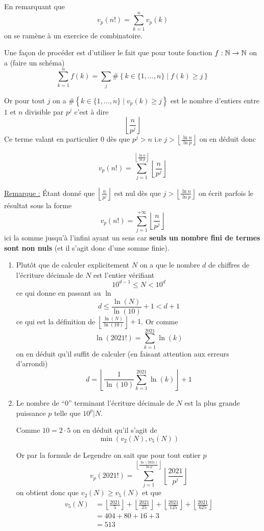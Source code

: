 \begin{sol}
En remarquant que
$$v_p(n!) = \sum_{k=1}^n v_p(k)$$
on se ramène à un exercice de combinatoire.

Une façon de procéder est d'utiliser le fait que pour toute fonction $f : \mathbb N \to \mathbb N$ on a (faire un schéma)
$$\sum_{k=1}^n f(k) = \sum_j \# \left\lbrace k \in \{1,\ldots,n\} \mid f(k) \ge j\right\rbrace$$

Or pour tout $j$  on a $\# \left\lbrace k \in \{1,\ldots,n\} \mid v_p(k) \ge j\right\rbrace$ est le nombre d'entiers entre $1$ et $n$ divisible par $p^j$ c'est à dire
$$\left\lfloor \frac n{p^j} \right\rfloor$$
Ce terme valant en particulier  $0$ dès que $p^j > n$ i.e $j > \left\lfloor \frac{\ln n}{\ln p} \right\rfloor$ on en déduit donc

$$\boxed{v_p(n!) = \sum_{j=1}^{\left\lfloor \frac{\ln n}{\ln p} \right\rfloor} \left\lfloor \frac n{p^j} \right\rfloor}$$

\underline{Remarque :} Étant donné que $\left\lfloor \frac n{p^j} \right\rfloor$ est nul dès que $j > \left\lfloor \frac{\ln n}{\ln p} \right\rfloor$ on écrit parfois le résultat sous la forme
$${v_p(n!) = \sum_{j=1}^{+\infty}  \left\lfloor \frac n{p^j} \right\rfloor}$$
ici la somme jusqu'à l'infini ayant un sens car \textbf{seuls un nombre fini de termes sont non nuls} (et il s'agit donc d'une somme finie).
\end{sol}


\begin{sol}
\begin{enumerate}
\item Plutôt que de calculer explicitement $N$ on a que le nombre $d$ de chiffres de l'écriture décimale de $N$ est l'entier vérifiant
$$10^{d-1} \le N < 10^{d}$$
ce qui donne en passant au $\ln$
$$d \le \frac{\ln(N)}{\ln(10)}+1 < d+1$$
ce qui est la définition de $\left\lfloor \frac{\ln(N)}{\ln(10)} \right\rfloor+1$. Or comme
$$\ln(2021!) = \sum_{k=1}^{2021} \ln(k)$$
on en déduit qu'il suffit de calculer (en faisant attention aux erreurs d'arrondi)
$$ \boxed{d = \left\lfloor \frac{1}{\ln(10)} \sum_{k=1}^{2021} \ln(k) \right\rfloor +1}$$
\item Le nombre de ``$0$'' terminant l'écriture décimale de $N$ est la plus grande puissance $p$ telle que $10^p | N$.

Comme $10 = 2 \cdot 5$ on en déduit qu'il s'agit de
$$\min(v_2(N),v_5(N))$$

Or par la formule de Legendre on sait que pour tout entier $p$
$$v_p(2021!) = \sum_{j=1}^{\left\lfloor \frac{\ln(2021)}{\ln p} \right\rfloor} \left\lfloor \frac{2021}{p^j} \right\rfloor$$
on obtient donc que $v_2(N) \ge v_5(N)$ et que
$$\begin{aligned}
v_5(N)
& =  \left\lfloor \frac{2021}{5} \right\rfloor + \left\lfloor \frac{2021}{25} \right\rfloor +\left\lfloor \frac{2021}{125} \right\rfloor + \left\lfloor \frac{2021}{625} \right\rfloor \\
& = 404 + 80 + 16 +3 \\
& = \boxed{513}
\end{aligned}$$
\end{enumerate}
\end{sol}


